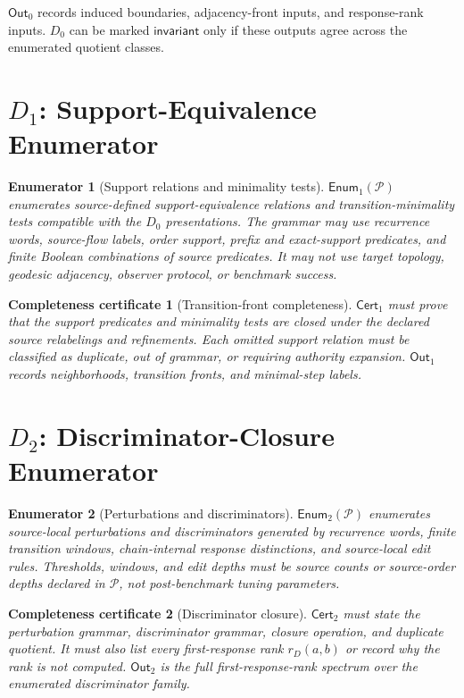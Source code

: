\documentclass[11pt]{article}
\newcommand{\Pack}{\mathcal{P}}
\newcommand{\Enum}{\mathsf{Enum}}
\newcommand{\Cert}{\mathsf{Cert}}
\newcommand{\Out}{\mathsf{Out}}
\newtheorem{enumerator}{Enumerator}
\newtheorem{certificate}{Completeness certificate}
\begin{document}
\(\Out_0\) records induced boundaries, adjacency-front inputs, and
response-rank inputs. \(D_0\) can be marked \(\mathsf{invariant}\) only if
these outputs agree across the enumerated quotient classes.

\section{\texorpdfstring{\(D_1\)}{D1}: Support-Equivalence Enumerator}

\begin{enumerator}[Support relations and minimality tests]
\(\Enum_1(\Pack)\) enumerates source-defined support-equivalence relations
and transition-minimality tests compatible with the \(D_0\) presentations.
The grammar may use recurrence words, source-flow labels, order support,
prefix and exact-support predicates, and finite Boolean combinations of
source predicates. It may not use target topology, geodesic adjacency,
observer protocol, or benchmark success.
\end{enumerator}

\begin{certificate}[Transition-front completeness]
\(\Cert_1\) must prove that the support predicates and minimality tests are
closed under the declared source relabelings and refinements. Each omitted
support relation must be classified as duplicate, out of grammar, or
requiring authority expansion. \(\Out_1\) records neighborhoods, transition
fronts, and minimal-step labels.
\end{certificate}

\section{\texorpdfstring{\(D_2\)}{D2}: Discriminator-Closure Enumerator}

\begin{enumerator}[Perturbations and discriminators]
\(\Enum_2(\Pack)\) enumerates source-local perturbations and discriminators
generated by recurrence words, finite transition windows, chain-internal
response distinctions, and source-local edit rules. Thresholds, windows, and
edit depths must be source counts or source-order depths declared in
\(\Pack\), not post-benchmark tuning parameters.
\end{enumerator}

\begin{certificate}[Discriminator closure]
\(\Cert_2\) must state the perturbation grammar, discriminator grammar,
closure operation, and duplicate quotient. It must also list every
first-response rank \(r_D(a,b)\) or record why the rank is not computed.
\(\Out_2\) is the full first-response-rank spectrum over the enumerated
discriminator family.
\end{certificate}
\end{document}
